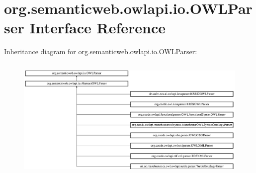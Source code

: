 \hypertarget{interfaceorg_1_1semanticweb_1_1owlapi_1_1io_1_1_o_w_l_parser}{\section{org.\-semanticweb.\-owlapi.\-io.\-O\-W\-L\-Parser Interface Reference}
\label{interfaceorg_1_1semanticweb_1_1owlapi_1_1io_1_1_o_w_l_parser}
}
Inheritance diagram for org.\-semanticweb.\-owlapi.\-io.\-O\-W\-L\-Parser\-:\begin{figure}[H]
\begin{center}
\leavevmode
\includegraphics[height=5.982906cm]{interfaceorg_1_1semanticweb_1_1owlapi_1_1io_1_1_o_w_l_parser}
\end{center}
\end{figure}
